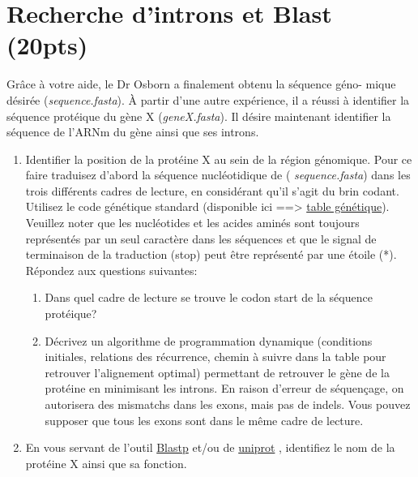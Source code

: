 \documentclass[12pt]{article}
\begin{document}
\section*{Recherche d'introns et Blast (20pts)}

Grâce à votre aide, le Dr Osborn a finalement obtenu la séquence géno-
mique désirée ({\it sequence.fasta}). À partir d'une autre expérience, il a
réussi à
identifier la séquence protéique du gène X ({\it geneX.fasta}). Il désire
maintenant
identifier la séquence de l'ARNm du gène ainsi que ses introns.
\begin{enumerate}


	\item  Identifier la position de la protéine X au sein de la région génomique.
	      Pour ce faire traduisez d'abord la séquence nucléotidique de ({\it
			      sequence.fasta}) dans les trois différents cadres de lecture, en considérant
	      qu'il s'agit du
	      brin codant. Utilisez le code génétique standard (disponible ici ==>
	      \href{https://www.ncbi.nlm.nih.gov/Taxonomy/Utils/wprintgc.cgi?chapter=tgencodes#SG1}{table génétique}).
	      Veuillez noter que les nucléotides et les acides aminés
	      sont toujours représentés par un seul caractère dans les séquences et
	      que le signal de terminaison de la traduction (stop) peut être représenté
	      par une étoile (*). Répondez aux questions suivantes:
	      \begin{enumerate}


		      \item  Dans quel cadre de lecture se trouve le codon start de la séquence
		            protéique?
		      \item  Décrivez un algorithme de programmation dynamique (conditions initiales, relations des récurrence, chemin à suivre dans la table pour retrouver l'alignement optimal) permettant de retrouver le gène de la protéine en minimisant les introns. En raison d'erreur de séquençage, on autorisera des mismatchs dans les exons, mais pas de indels. Vous pouvez supposer que tous les exons sont dans le même cadre de lecture.
	      \end{enumerate}
	\item  En vous servant de l'outil
	      \href{
		      https://blast.ncbi.nlm.nih.gov/Blast.cgi?PROGRAM=blastp&PAGE_TYPE=BlastSearch&LI
		      NK_LOC=blasthome}{Blastp} et/ou de
	      \href{https://www.uniprot.org/blast/}{uniprot} , identifiez le nom
	      de la protéine X ainsi que sa fonction.
\end{enumerate}
\end{document}
